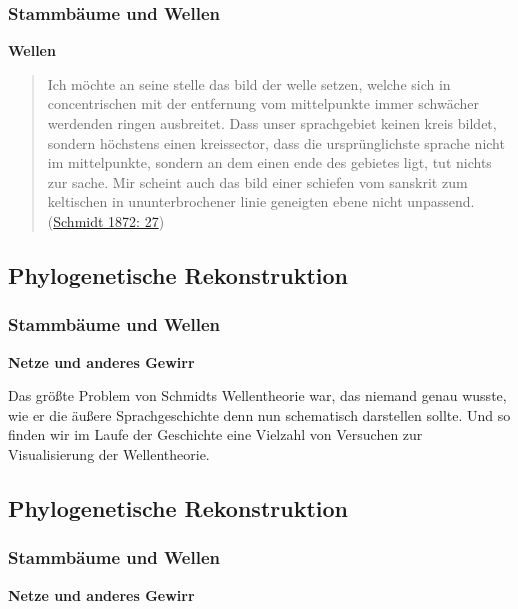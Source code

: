 \subsubsection{\texorpdfstring{{Stammbäume und
Wellen}}{Stammbäume und Wellen}}

\textbf{Wellen}

\begin{quote}
Ich möchte an seine stelle das bild der welle setzen, welche sich in
concentrischen mit der entfernung vom mittelpunkte immer schwächer
werdenden ringen ausbreitet. Dass unser sprachgebiet keinen kreis
bildet, sondern höchstens einen kreissector, dass die ursprünglichste
sprache nicht im mittelpunkte, sondern an dem einen ende des gebietes
ligt, tut nichts zur sache. Mir scheint auch das bild einer schiefen vom
sanskrit zum keltischen in ununterbrochener linie geneigten ebene nicht
unpassend.
(\href{http://bibliography.lingpy.org?key=Schmidt1872}{Schmidt 1872:
27})
\end{quote}

\subsection{\texorpdfstring{{Phylogenetische
Rekonstruktion}}{Phylogenetische Rekonstruktion}}

\subsubsection{\texorpdfstring{{Stammbäume und
Wellen}}{Stammbäume und Wellen}}

\textbf{Netze und anderes Gewirr}

Das größte Problem von Schmidts Wellentheorie war, das niemand genau
wusste, wie er die äußere Sprachgeschichte denn nun schematisch
darstellen sollte. Und so finden wir im Laufe der Geschichte eine
Vielzahl von Versuchen zur Visualisierung der Wellentheorie.

\subsection{\texorpdfstring{{Phylogenetische
Rekonstruktion}}{Phylogenetische Rekonstruktion}}

\subsubsection{\texorpdfstring{{Stammbäume und
Wellen}}{Stammbäume und Wellen}}

\textbf{Netze und anderes Gewirr}

